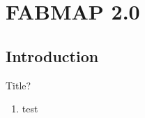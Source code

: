 \section{FABMAP 2.0}

\subsection{Introduction}
\begin{frame}{Title?}
   \begin{enumerate}
       \item test
   \end{enumerate} 
\end{frame}
